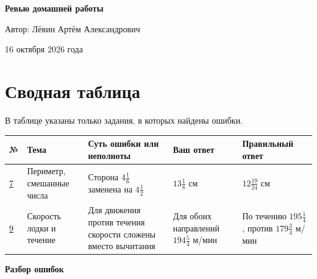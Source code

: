 \documentclass[12pt,a4paper]{article}
\begin{document}
\begin{titlepage}
  \centering
  \vspace*{58mm}
  {\Huge\bfseries Ревью домашней работы\par}
  \vspace{20mm}
  {\Large Автор: Лёвин Артём Александрович\par}
  \vspace{9mm}
  {\large 16 октября 2026 года\par}
  \vfill
\end{titlepage}
\newpage
\section*{Сводная таблица}
В таблице указаны только задания, в которых найдены ошибки.
\begingroup\small\setlength{\tabcolsep}{4pt}\renewcommand{\arraystretch}{1.35}
\begin{longtable}{@{}p{14mm}p{32mm}p{52mm}p{27mm}p{28mm}@{}}
\toprule
№ & Тема & Суть ошибки или неполноты & Ваш ответ & Правильный ответ\\
\midrule
\endhead
\hyperref[task:7]{7} & Периметр, смешанные числа & Сторона $4\frac16$ заменена на $4\frac12$ & $13\frac18$ см & $12\frac{19}{24}$ см\\
\hyperref[task:9]{9} & Скорость лодки и течение & Для движения против течения скорости сложены вместо вычитания & Для обоих направлений $194\frac54$ м/мин & По течению $195\frac14$, против $179\frac34$ м/мин\\
\bottomrule
\end{longtable}
\endgroup
\clearpage
\thispagestyle{empty}
\null\vfill
\begin{center}{\Huge\bfseries Разбор ошибок}\end{center}
\vfill\null
\clearpage

\label{task:7}
\end{document}
